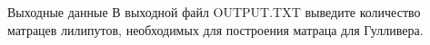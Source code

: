 Выходные данные
В выходной файл OUTPUT.TXT выведите количество матрацев лилипутов, необходимых для построения матраца для Гулливера.